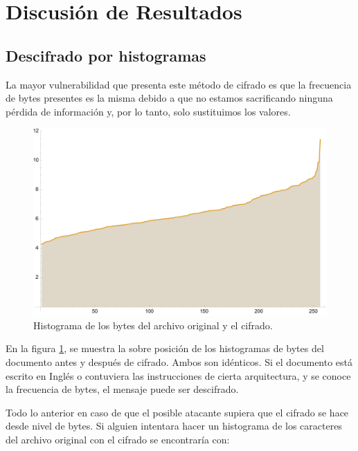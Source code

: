 \documentclass[a4paper]{article}
\begin{document}
\newpage
\section{Discusión de Resultados}

\subsection{Descifrado por histogramas}

La mayor vulnerabilidad que presenta este método de cifrado es que la
frecuencia de bytes presentes es la misma debido a que no estamos
sacrificando ninguna pérdida de información y, por lo tanto, solo sustituimos
los
valores.

\begin{figure}[H]
    \centering
    \includegraphics[width=\textwidth]{historygram.png}
    \caption{Histograma de los bytes del archivo
original y el cifrado.}
    \label{fig:Histo1}
\end{figure}

En la figura \ref{fig:Histo1}, se muestra la sobre posición de los histogramas
de bytes del documento antes y después de cifrado. Ambos son idénticos. Si el
documento está escrito en Inglés o contuviera las instrucciones de cierta
arquitectura, y se conoce la frecuencia de bytes, el mensaje puede ser
descifrado.

Todo lo anterior en caso de que el posible atacante supiera que el cifrado se
hace desde nivel de bytes. Si alguien intentara hacer un histograma de los
caracteres del archivo original con el cifrado se encontraría con:
\end{document}
